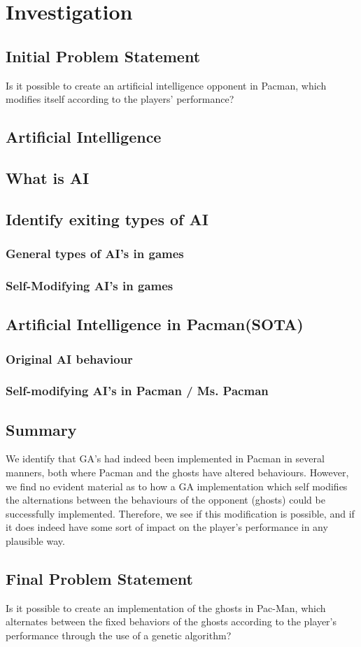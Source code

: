 \section{Investigation} \label{sec:preanalysus}

\subsection{Initial Problem Statement} \label{sec:initialproblemstatement}
Is it possible to create an artificial intelligence opponent in Pacman, which modifies itself according to the players' performance?


\subsection{Artificial Intelligence} \label{sec:ai}
\subsection{What is AI}
\subsection{Identify exiting types of AI}
\subsubsection{General types of AI's in games}
\subsubsection{Self-Modifying AI's in games}


\subsection{Artificial Intelligence in Pacman(SOTA)}
\subsubsection{Original AI behaviour}
\subsubsection{Self-modifying AI's in Pacman / Ms. Pacman}

\subsection{Summary}
We identify that GA’s had indeed been implemented in Pacman in several manners, both where Pacman and the ghosts have altered behaviours. However, we find no evident material as to how a GA implementation which self modifies the alternations between the behaviours of the opponent (ghosts) could be successfully implemented. Therefore, we see if this modification is possible, and if it does indeed have some sort of impact on the player’s performance in any plausible way.


\subsection{Final Problem Statement} \label{sec:finalproblemstatement}
Is it possible to create an implementation of the ghosts in Pac-Man, which alternates between the fixed behaviors of the ghosts according to the player's performance through the use of a genetic algorithm?